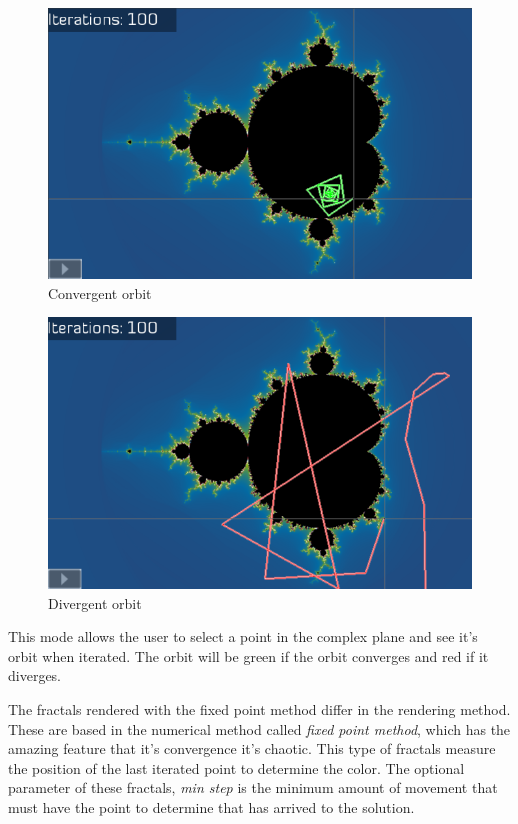 \documentclass[oneside]{book}
\begin{document}
\begin{figure}[h!]
	\centering
	\includegraphics[scale=0.7]{img/sc7.png}
	\caption{Convergent orbit}
	\label{Orbit1}
\end{figure}

\begin{figure}[h!]
	\centering
	\includegraphics[scale=0.7]{img/sc8.png}
	\caption{Divergent orbit}
	\label{Orbit2}
\end{figure}

This mode allows the user to select a point in the complex plane and see it's orbit when iterated. The orbit will be green if the orbit converges and red if it diverges.

The fractals rendered with the fixed point method differ in the rendering method. These are based in the numerical method called \textit{fixed point method}, which has the amazing feature that it's convergence it's chaotic. This type of fractals measure the position of the last iterated point to determine the color. The optional parameter of these fractals, \textit{min step} is the minimum amount of movement that must have the point to determine that has arrived to the solution.
\end{document}
